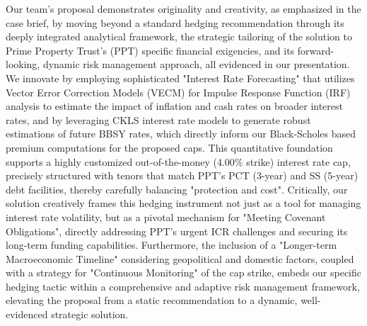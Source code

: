 \documentclass[11pt, a4paper, british]{article}
\begin{document}
Our team's proposal demonstrates originality and creativity, as emphasized in the case brief, by moving beyond a standard hedging recommendation through its deeply integrated analytical framework, the strategic tailoring of the solution to Prime Property Trust's (PPT) specific financial exigencies, and its forward-looking, dynamic risk management approach, all evidenced in our presentation. We innovate by employing sophisticated "Interest Rate Forecasting" that utilizes Vector Error Correction Models (VECM) for Impulse Response Function (IRF) analysis to estimate the impact of inflation and cash rates on broader interest rates, and by leveraging CKLS interest rate models to generate robust estimations of future BBSY rates, which directly inform our Black-Scholes based premium computations for the proposed caps. This quantitative foundation supports a highly customized out-of-the-money (4.00\% strike) interest rate cap, precisely structured with tenors that match PPT's PCT (3-year) and SS (5-year) debt facilities, thereby carefully balancing "protection and cost". Critically, our solution creatively frames this hedging instrument not just as a tool for managing interest rate volatility, but as a pivotal mechanism for "Meeting Covenant Obligations", directly addressing PPT's urgent ICR challenges and securing its long-term funding capabilities. Furthermore, the inclusion of a "Longer-term Macroeconomic Timeline" considering geopolitical and domestic factors, coupled with a strategy for "Continuous Monitoring" of the cap strike, embeds our specific hedging tactic within a comprehensive and adaptive risk management framework, elevating the proposal from a static recommendation to a dynamic, well-evidenced strategic solution.

\newpage

\printbibliography
\end{document}
